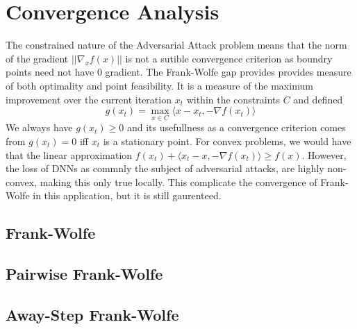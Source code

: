 \documentclass{article}
\begin{document}
\section{Convergence Analysis}
The constrained nature of the Adversarial Attack problem means that the norm of the gradient $||\nabla_x f(x)||$ is not a sutible convergence criterion as boundry points need not have $0$ gradient. 
The Frank-Wolfe gap provides provides measure of both optimality and point feasibility. It is a measure of the maximum improvement over the current iteration $x_t$ within the constraints $C$ and defined
$$g(x_t) = \max_{x\in C} \langle x - x_t, -\nabla f(x_t)\rangle$$
We always have $g(x_t) \geq 0$ and  its usefullness as a convergence criterion comes from $g(x_t) = 0$ iff $x_t$ is a stationary point. 
For convex problems, we would have that the linear approximation $f(x_t) + \langle x_t - x, -\nabla f(x_t) \rangle \geq f(x)$. However, the loss of DNNs as commnly the subject of adversarial attacks, are highly non-convex, making this only true locally. This complicate the convergence of Frank-Wolfe in this application, but it is still gaurenteed.

\subsection{Frank-Wolfe}
\subsection{Pairwise Frank-Wolfe}
\subsection{Away-Step Frank-Wolfe}
\end{document}
